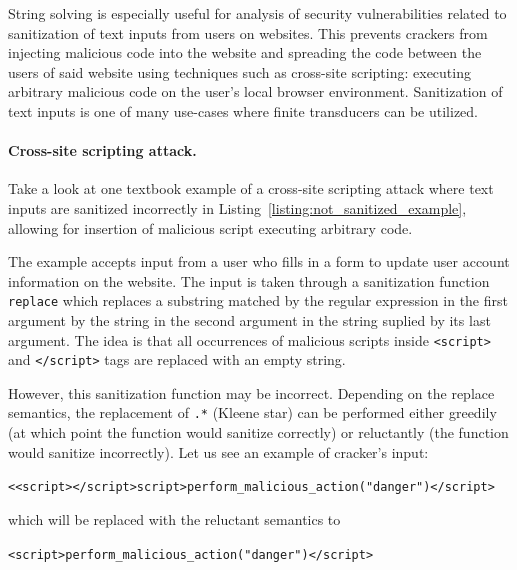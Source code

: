 String solving is especially useful for analysis of security vulnerabilities related to sanitization of text inputs from users on websites.
This prevents crackers from injecting malicious code into the website and spreading the code between the users of said website using techniques such as cross-site scripting: executing arbitrary malicious code on the user's local browser environment.
Sanitization of text inputs is one of many use-cases where finite transducers can be utilized.

\paragraph{Cross-site scripting attack.}
Take a look at one textbook example of a cross-site scripting attack where text inputs are sanitized incorrectly in Listing~\ref{listing:not_sanitized_example}, allowing for insertion of malicious script executing arbitrary code.

The example accepts input from a user who fills in a form to update user account information on the website.
The input is taken through a sanitization function \texttt{replace} which replaces a substring matched by the regular expression in the first argument by the string in the second argument in the string suplied by its last argument.
The idea is that all occurrences of malicious scripts inside \texttt{<script>} and \texttt{</script>} tags are replaced with an empty string.

However, this sanitization function may be incorrect.
Depending on the replace semantics, the replacement of \texttt{.*} (Kleene star) can be performed either greedily (at which point the function would sanitize correctly) or reluctantly (the function would sanitize incorrectly).
Let us see an example of cracker's input:
\begin{center}
 \texttt{<<script></script>script>perform\_malicious\_action("danger")</script>}
\end{center}
which will be replaced with the reluctant semantics to
\begin{center}
 \texttt{<script>perform\_malicious\_action("danger")</script>}
\end{center}

